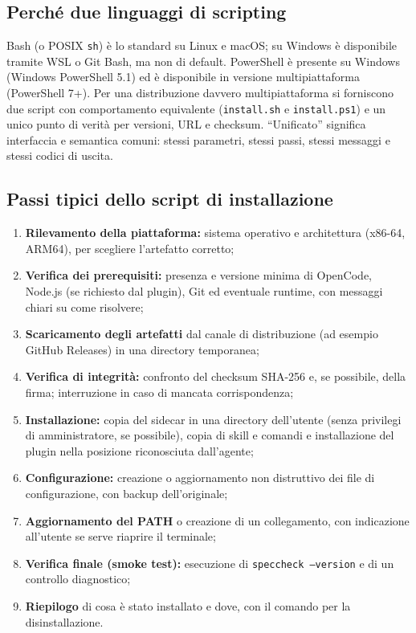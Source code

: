 \documentclass[a4paper, 11pt]{article}
\begin{document}
\subsection{Perché due linguaggi di scripting}
Bash (o POSIX \texttt{sh}) è lo standard su Linux e macOS; su Windows è disponibile tramite WSL o Git Bash, ma non di default. PowerShell è presente su Windows (Windows PowerShell 5.1) ed è disponibile in versione multipiattaforma (PowerShell 7+). Per una distribuzione davvero multipiattaforma si forniscono due script con comportamento equivalente (\texttt{install.sh} e \texttt{install.ps1}) e un unico punto di verità per versioni, URL e checksum. ``Unificato'' significa interfaccia e semantica comuni: stessi parametri, stessi passi, stessi messaggi e stessi codici di uscita.

\subsection{Passi tipici dello script di installazione}
\begin{enumerate}[noitemsep]
    \item \textbf{Rilevamento della piattaforma:} sistema operativo e architettura (x86-64, ARM64), per scegliere l'artefatto corretto;
    \item \textbf{Verifica dei prerequisiti:} presenza e versione minima di OpenCode, Node.js (se richiesto dal plugin), Git ed eventuale runtime, con messaggi chiari su come risolvere;
    \item \textbf{Scaricamento degli artefatti} dal canale di distribuzione (ad esempio GitHub Releases) in una directory temporanea;
    \item \textbf{Verifica di integrità:} confronto del checksum SHA-256 e, se possibile, della firma; interruzione in caso di mancata corrispondenza;
    \item \textbf{Installazione:} copia del sidecar in una directory dell'utente (senza privilegi di amministratore, se possibile), copia di skill e comandi e installazione del plugin nella posizione riconosciuta dall'agente;
    \item \textbf{Configurazione:} creazione o aggiornamento non distruttivo dei file di configurazione, con backup dell'originale;
    \item \textbf{Aggiornamento del PATH} o creazione di un collegamento, con indicazione all'utente se serve riaprire il terminale;
    \item \textbf{Verifica finale (smoke test):} esecuzione di \texttt{speccheck --version} e di un controllo diagnostico;
    \item \textbf{Riepilogo} di cosa è stato installato e dove, con il comando per la disinstallazione.
\end{enumerate}
\end{document}
